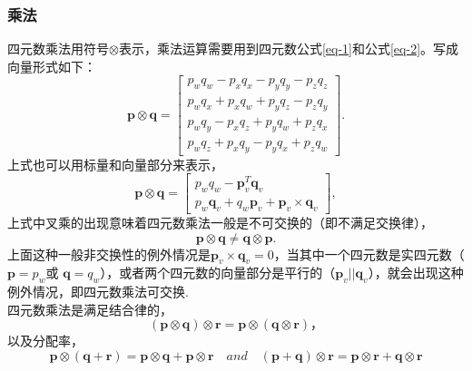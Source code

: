 \documentclass[10pt, a4paper]{article}
\begin{document}
  \subsubsection{乘法}
  四元数乘法用符号$\otimes$表示，乘法运算需要用到四元数公式\eqref{eq-1}和公式\eqref{eq-2}。写成向量形式如下：\\
  \begin{equation} \label{eq-12}
    \mathbf{p} \otimes \mathbf{q} =
    \begin{bmatrix}
      p_w q_w - p_x q_x - p_y q_y - p_z q_z \\
      p_w q_x + p_x q_w + p_y q_z - p_z q_y \\
      p_w q_y - p_x q_z + p_y q_w + p_z q_x \\
      p_w q_z + p_x q_y - p_y q_x + p_z q_w
    \end{bmatrix} .
  \end{equation}
  上式也可以用标量和向量部分来表示，
  \begin{equation} \label{eq-13}
    \mathbf{p} \otimes \mathbf{q} =
    \begin{bmatrix}
      p_w q_w - \mathbf{p}^T_v \mathbf{q}_v \\
      p_w \mathbf{q}_v + q_w \mathbf{p}_v + \mathbf{p}_v \times \mathbf{q}_v
    \end{bmatrix} ,
  \end{equation}
  上式中叉乘的出现意味着四元数乘法一般是不可交换的（即不满足交换律），
  \begin{equation} \label{eq-14}
    \mathbf{p} \otimes \mathbf{q} \neq \mathbf{q} \otimes \mathbf{p} .
  \end{equation}
  上面这种一般非交换性的例外情况是$\mathbf{p}_v \times \mathbf{q}_v = 0$，当其中一个四元数是实四元数（$\mathbf{p} = p_w$或
  $\mathbf{q} = q_w$），或者两个四元数的向量部分是平行的（$\mathbf{p}_v || \mathbf{q}_v$），就会出现这种例外情况，即四元数乘法可交换.\\
  四元数乘法是满足结合律的， \\
  \begin{equation} \label{eq-15}
    (\mathbf{p} \otimes \mathbf{q}) \otimes \mathbf{r} = \mathbf{p} \otimes (\mathbf{q} \otimes \mathbf{r})，
  \end{equation}
  以及分配率，
  \begin{equation} \label{eq-16}
    \mathbf{p} \otimes (\mathbf{q} + \mathbf{r}) = \mathbf{p} \otimes \mathbf{q} + \mathbf{p} \otimes \mathbf{r}
    \quad and \quad
    (\mathbf{p} + \mathbf{q}) \otimes \mathbf{r} = \mathbf{p} \otimes \mathbf{r} + \mathbf{q} \otimes \mathbf{r}
  \end{equation}
\end{document}
